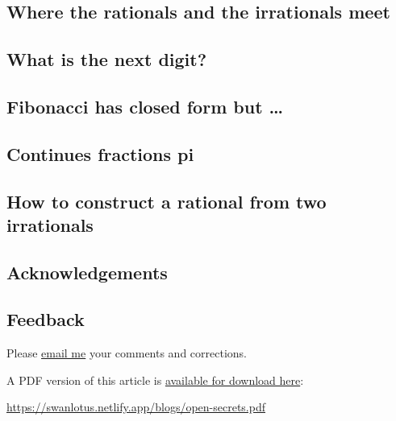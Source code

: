 \documentclass[
  a4paper,
]{article}
\begin{document}
\hypertarget{where-the-rationals-and-the-irrationals-meet}{%
\subsection{Where the rationals and the irrationals
meet}\label{where-the-rationals-and-the-irrationals-meet}}

\hypertarget{what-is-the-next-digit}{%
\subsection{What is the next digit?}\label{what-is-the-next-digit}}

\hypertarget{fibonacci-has-closed-form-but}{%
\subsection{Fibonacci has closed form but
\ldots{}}\label{fibonacci-has-closed-form-but}}

\hypertarget{continues-fractions-pi}{%
\subsection{Continues fractions pi}\label{continues-fractions-pi}}

\hypertarget{how-to-construct-a-rational-from-two-irrationals}{%
\subsection{How to construct a rational from two
irrationals}\label{how-to-construct-a-rational-from-two-irrationals}}

\hypertarget{acknowledgements}{%
\subsection{Acknowledgements}\label{acknowledgements}}

\hypertarget{feedback}{%
\subsection{Feedback}\label{feedback}}

Please \href{mailto:feedback.swanlotus@gmail.com}{email me} your
comments and corrections.

\noindent A PDF version of this article is
\href{./open-secrets.pdf}{available for download here}:

\begin{small}

\begin{sffamily}

\url{https://swanlotus.netlify.app/blogs/open-secrets.pdf}

\end{sffamily}

\end{small}
\end{document}
